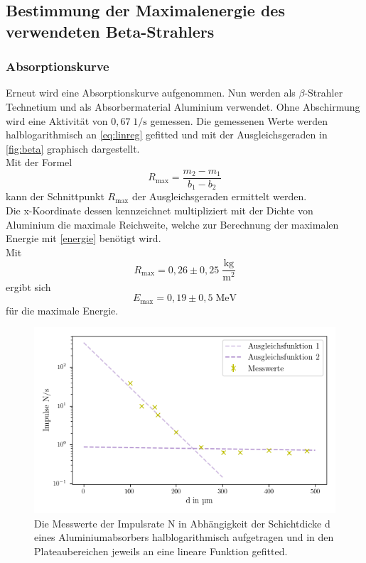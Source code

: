 \subsection{Bestimmung der Maximalenergie des verwendeten Beta-Strahlers}
\subsubsection*{Absorptionskurve}
Erneut wird eine Absorptionskurve aufgenommen. Nun werden als $\beta$-Strahler Technetium
und als Absorbermaterial Aluminium verwendet. 
Ohne Abschirmung wird eine Aktivität von $0,67 \; \mathrm{1/s}$ gemessen.
Die gemessenen Werte werden halblogarithmisch an \autoref{eq:linreg} gefitted und mit der Ausgleichsgeraden
in \autoref{fig:beta} graphisch dargestellt.\\
Mit der Formel
\begin{equation*}
  R_{\max} = \frac{m_2 - m_1}{b_1 - b_2}
\end{equation*}
kann der Schnittpunkt $R_{\max}$ der Ausgleichsgeraden ermittelt werden.\\
Die x-Koordinate dessen kennzeichnet multipliziert mit der Dichte von Aluminium \cite{aludichte} die maximale Reichweite, welche 
zur Berechnung der maximalen Energie mit \eqref{energie} benötigt wird. \\
Mit 
\begin{equation*}
  R_{\max} = 0,26 \pm 0,25 \; \mathrm{\frac{kg}{m^2}}   %
\end{equation*}
ergibt sich 
\begin{equation*}
  E_{\max} = 0,19 \pm 0,5 \; \mathrm{MeV}    %
\end{equation*}
für die maximale Energie.

\begin{figure}[H]
  \centering
  \includegraphics{content/zeitdruck.png}
  \caption{Die Messwerte der Impulsrate N in Abhängigkeit der 
  Schichtdicke d eines Aluminiumabsorbers halblogarithmisch aufgetragen und in den Plateaubereichen jeweils an eine lineare Funktion gefitted.}
  \label{fig:beta}
\end{figure}
